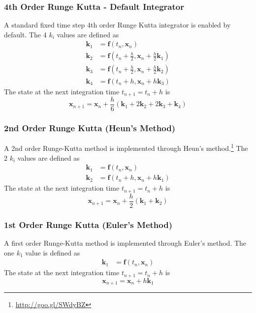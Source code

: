 \subsubsection{4th Order Runge Kutta - Default Integrator}
A standard fixed time step 4th order Runge Kutta integrator is enabled by default.  The 4 $k_{i}$ values are defined as
\begin{align}
	\bm k_{1} &= \bm f\left(t_{n}, \bm x_{n}\right) \\
	\bm k_{2} &= \bm f\left(t_{n} + \frac{h}{2}, \bm x_{n} + \frac{h}{2} \bm k_{1}\right) \\
	\bm k_{3} &= \bm f\left(t_{n} + \frac{h}{2}, \bm x_{n} + \frac{h}{2} \bm k_{2}\right) \\
	\bm k_{4} &= \bm f\left(t_{n} + h, \bm x_{n} + h \bm k_{3}\right) 
\end{align}
The state at the next integration time $t_{n+1} = t_{n} + h$ is
\begin{equation}
	\bm x_{n+1} = \bm x_{n} + \frac{h}{6} \left(
		\bm k_{1} + 2 \bm k_{2} + 2 \bm k_{3} + \bm k_{4}
	\right)
\end{equation}


\subsubsection{2nd Order Runge Kutta (Heun's Method)}
A 2nd order Runge-Kutta method is implemented through Heun's method.\footnote{\url{http://goo.gl/SWdyBZ}} The 2 $k_{i}$ values are defined as
\begin{align}
	\bm k_{1} &= \bm f(t_{n}, \bm x_{n}) \\
	\bm k_{2} &= \bm f(t_{n} + h, \bm x_{n} + h \bm k_{1}) 
\end{align}
The state at the next integration time $t_{n+1} = t_{n} + h$ is
\begin{equation}
	\bm x_{n+1} = \bm x_{n} + \frac{h}{2} \left(
		\bm k_{1} +  \bm k_{2}
	\right)
\end{equation}


\subsubsection{1st Order Runge Kutta (Euler's Method)}
A first order Runge-Kutta method is implemented through Euler's method. The one $k_{1}$ value is defined as
\begin{align}
	\bm k_{1} &= \bm f(t_{n}, \bm x_{n}) 
\end{align}
The state at the next integration time $t_{n+1} = t_{n} + h$ is
\begin{equation}
	\bm x_{n+1} = \bm x_{n} + h
		\bm k_{1}
\end{equation}


